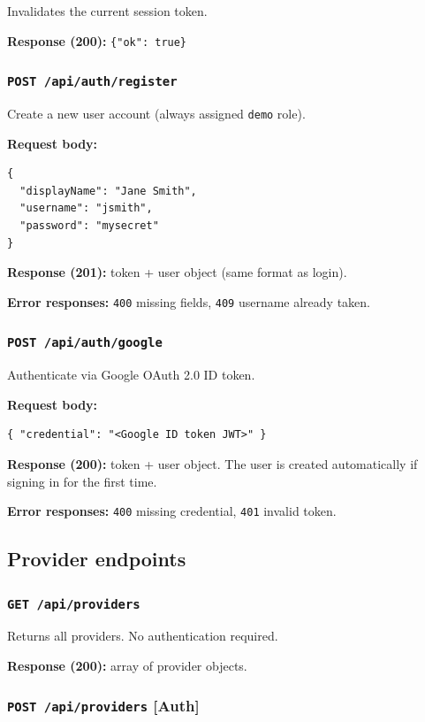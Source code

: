 \documentclass[12pt,a4paper]{article}
\begin{document}
Invalidates the current session token.

\textbf{Response (200):} \texttt{\{"ok": true\}}

\subsubsection{\texttt{POST /api/auth/register}}

Create a new user account (always assigned \texttt{demo} role).

\textbf{Request body:}
\begin{lstlisting}[language={}]
{
  "displayName": "Jane Smith",
  "username": "jsmith",
  "password": "mysecret"
}
\end{lstlisting}

\textbf{Response (201):} token + user object (same format as login).

\textbf{Error responses:} \texttt{400} missing fields, \texttt{409} username already taken.

\subsubsection{\texttt{POST /api/auth/google}}

Authenticate via Google OAuth 2.0 ID token.

\textbf{Request body:}
\begin{lstlisting}[language={}]
{ "credential": "<Google ID token JWT>" }
\end{lstlisting}

\textbf{Response (200):} token + user object. The user is created automatically if signing in for the first time.

\textbf{Error responses:} \texttt{400} missing credential, \texttt{401} invalid token.

\subsection{Provider endpoints}

\subsubsection{\texttt{GET /api/providers}}

Returns all providers. No authentication required.

\textbf{Response (200):} array of provider objects.

\subsubsection{\texttt{POST /api/providers} \textnormal{\textbf{[Auth]}}}
\end{document}
